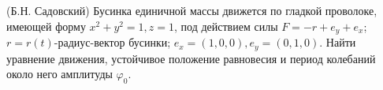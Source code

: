 (Б.Н. Садовский)
Бусинка единичной массы движется по гладкой проволоке, имеющей
форму $x^2+y^2=1,z=1$, под действием силы $F=-r+e_y+e_x$;
$r=r(t)$-радиус-вектор бусинки; $e_x=(1,0,0),e_y=(0,1,0)$. Найти уравнение
движения, устойчивое положение равновесия и период колебаний около
него амплитуды $\varphi_0$.
